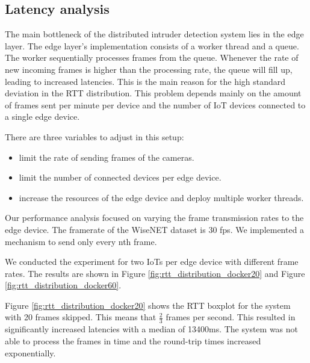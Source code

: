 \documentclass[conference]{IEEEtran}
\begin{document}
\subsection{Latency analysis}
\label{sec:latency_analysis}
The main bottleneck of the distributed intruder detection system lies in the edge layer. The edge layer's implementation consists of a worker thread and a queue. The worker sequentially processes frames from the queue. Whenever the rate of new incoming frames is higher than the processing rate, the queue will fill up, leading to increased latencies. This is the main reason for the high standard deviation in the RTT distribution. This problem depends mainly on the amount of frames sent per minute per device and the number of IoT devices connected to a single edge device. 


There are three variables to adjust in this setup: 
\begin{itemize}
    \item limit the rate of sending frames of the cameras.
    \item limit the number of connected devices per edge device.
    \item increase the resources of the edge device and deploy multiple worker threads.
\end{itemize}


Our performance analysis focused on varying the frame transmission rates to the edge device. The framerate of the WiseNET dataset is 30 fps. We implemented a mechanism to send only every nth frame.



We conducted the experiment for two IoTs per edge device with different frame rates. The results are shown in Figure \ref{fig:rtt_distribution_docker20} and Figure \ref{fig:rtt_distribution_docker60}.


Figure \ref{fig:rtt_distribution_docker20} shows the RTT boxplot for the system with 20 frames skipped. This means that $\frac{2}{3}$ frames per second.
This resulted in significantly increased latencies with a median of 13400ms. The system was not able to process the frames in time and the round-trip times increased exponentially. 
\end{document}
